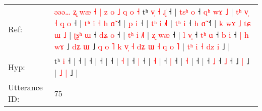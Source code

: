 \documentclass[10pt]{article}
\DeclareRobustCommand{\hl}[1]{{\textcolor{red}{#1}}}
\begin{document}
\begin{longtable}{ll}
Ref: & \hl{ə}\hl{ə}\hl{ə}\hl{…}\hl{ }\hl{ʐ}\hl{ }\hl{w}\hl{æ}\hl{ }\hl{˧}\hl{ }\hl{|}\hl{ }\hl{z}\hl{ }\hl{o}\hl{ }\hl{˩}\hl{ }\hl{q}\hl{ }\hl{o}\hl{ }\hl{˧}\hl{ }tʰ\hl{ }\hl{v}\hl{̩}\hl{ }\hl{˧} \hl{ɻ}\hl{̍} ˧ |\hl{ }\hl{t}\hl{s}\hl{ʰ}\hl{ }\hl{o} ˧\hl{ }\hl{q}\hl{ʰ}\hl{ }\hl{w}\hl{ɤ}\hl{ }\hl{˩} |\hl{ }\hl{t}\hl{ʰ}\hl{ }\hl{v}\hl{̩}\hl{ }\hl{˧}\hl{ }\hl{q}\hl{ }\hl{o} ˧ |\hl{ }\hl{t}\hl{ʰ}\hl{ }\hl{i}\hl{ }\hl{˧}\hl{ }\hl{h}\hl{ }\hl{ɑ}\hl{̃} ˧\hl{˥} |\hl{ }\hl{p}\hl{ }\hl{i} ˧ |\hl{ }\hl{t}\hl{ʰ}\hl{ }\hl{i} \hl{˩}\hl{˥} |\hl{ }\hl{t}\hl{ʰ}\hl{ }\hl{i} ˧\hl{ }\hl{h} \hl{ɑ}\hl{̃} ˧\hl{˥} |\hl{ }\hl{k}\hl{ }\hl{w}\hl{ɤ}\hl{ }\hl{˩}\hl{ }\hl{t}\hl{ɕ}\hl{ }\hl{ɯ} \hl{˩} |\hl{ }\hl{ʈ}\hl{ʂ}\hl{ʰ}\hl{ }\hl{ɯ} ˧\hl{ }\hl{d}\hl{ʑ} \hl{o} ˧ |\hl{ }\hl{t}\hl{ʰ}\hl{ }\hl{i} \hl{˩}\hl{˥} |\hl{ }\hl{ʐ}\hl{ }\hl{w}\hl{æ} ˧ |\hl{ }\hl{l}\hl{ }\hl{v}\hl{̩} ˧\hl{ }\hl{t}\hl{ʰ} \hl{ɑ} ˧\hl{ }\hl{b} \hl{i} ˧\hl{ }\hl{|}\hl{ }\hl{h}\hl{ }\hl{w}\hl{ɤ} ˩\hl{ }\hl{d}\hl{ʑ} \hl{ɯ} ˩\hl{ }\hl{q}\hl{ }\hl{o}\hl{ }\hl{˥}\hl{ }\hl{k}\hl{ }\hl{v}\hl{̩}\hl{ }\hl{˧}\hl{ }\hl{d}\hl{ʑ}\hl{ }\hl{ɯ}\hl{ }\hl{˧}\hl{ }\hl{q}\hl{ }\hl{o}\hl{ }\hl{˥} |\hl{ }\hl{t}\hl{ʰ}\hl{ }\hl{i}\hl{ }\hl{˧} \hl{d}\hl{z} \hl{i} ˩ |
 \\
Hyp: & \hl{}\hl{}\hl{}\hl{}\hl{}\hl{}\hl{}\hl{}\hl{}\hl{}\hl{}\hl{}\hl{}\hl{}\hl{}\hl{}\hl{}\hl{}\hl{}\hl{}\hl{}\hl{}\hl{}\hl{}\hl{}\hl{}tʰ\hl{}\hl{}\hl{}\hl{}\hl{} \hl{}\hl{i} ˧ |\hl{}\hl{}\hl{}\hl{}\hl{}\hl{} ˧\hl{}\hl{}\hl{}\hl{}\hl{}\hl{}\hl{}\hl{} |\hl{}\hl{}\hl{}\hl{}\hl{}\hl{}\hl{}\hl{}\hl{}\hl{}\hl{}\hl{} ˧ |\hl{}\hl{}\hl{}\hl{}\hl{}\hl{}\hl{}\hl{}\hl{}\hl{}\hl{}\hl{} ˧\hl{} |\hl{}\hl{}\hl{}\hl{} ˧ |\hl{}\hl{}\hl{}\hl{}\hl{} \hl{}\hl{˧} |\hl{}\hl{}\hl{}\hl{}\hl{} ˧\hl{}\hl{} \hl{}\hl{|} ˧\hl{} |\hl{}\hl{}\hl{}\hl{}\hl{}\hl{}\hl{}\hl{}\hl{}\hl{}\hl{}\hl{} \hl{˧} |\hl{}\hl{}\hl{}\hl{}\hl{}\hl{} ˧\hl{}\hl{}\hl{} \hl{|} ˧ |\hl{}\hl{}\hl{}\hl{}\hl{} \hl{}\hl{˧} |\hl{}\hl{}\hl{}\hl{}\hl{} ˧ |\hl{}\hl{}\hl{}\hl{}\hl{} ˧\hl{}\hl{}\hl{} \hl{˩} ˧\hl{}\hl{} \hl{˩} ˧\hl{}\hl{}\hl{}\hl{}\hl{}\hl{}\hl{} ˩\hl{}\hl{}\hl{} \hl{|} ˩\hl{}\hl{}\hl{}\hl{}\hl{}\hl{}\hl{}\hl{}\hl{}\hl{}\hl{}\hl{}\hl{}\hl{}\hl{}\hl{}\hl{}\hl{}\hl{}\hl{}\hl{}\hl{}\hl{}\hl{}\hl{}\hl{} |\hl{}\hl{}\hl{}\hl{}\hl{}\hl{}\hl{} \hl{}\hl{˩} \hl{|} ˩ |
 \\
\midrule
Utterance ID: & 75 \\

\end{longtable}
\end{document}

